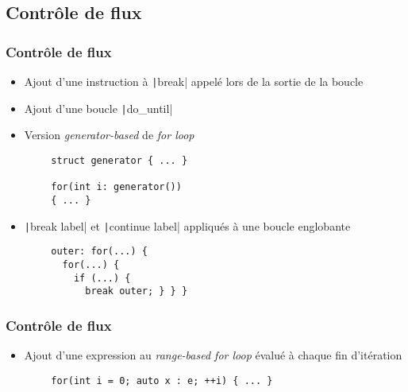 \documentclass[C++.tex]{subfiles}
\begin{document}
\subsection*{Contrôle de flux}
\begin{frame}[fragile]
	\frametitle{Contrôle de flux}
	\begin{itemize}
		\item Ajout d'une instruction à \texttt|break| appelé lors de la sortie de la boucle


		\item Ajout d'une boucle \texttt|do_until|
		\item Version \textit{generator-based} de \textit{for loop}
	\end{itemize}

	\begin{verbatim}
		struct generator { ... }

		for(int i: generator())
		{ ... }
	\end{verbatim}

	\begin{itemize}
		\item \texttt|break label| et \texttt|continue label| appliqués à une boucle englobante
	\end{itemize}

	\begin{verbatim}
		outer: for(...) {
		  for(...) {
		    if (...) {
		      break outer; } } }
	\end{verbatim}

\end{frame}

\begin{frame}[fragile]
	\frametitle{Contrôle de flux}
	\begin{itemize}
		\item Ajout d'une expression au \textit{range-based for loop} évalué à chaque fin d'itération
	\end{itemize}

	\begin{verbatim}
		for(int i = 0; auto x : e; ++i) { ... }
	\end{verbatim}

\end{frame}
\end{document}
